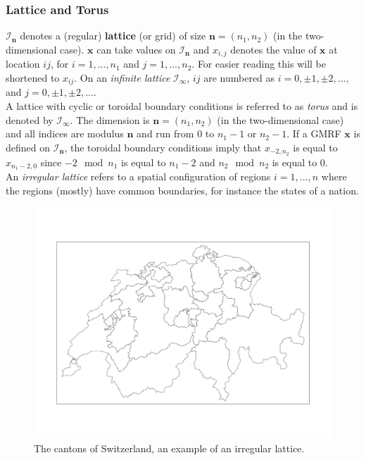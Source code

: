 \subsubsection*{Lattice and Torus}
$\mathcal{I}_{\pmb{n}}$ denotes a (regular) \textbf{lattice} (or grid) of size $\pmb{n}=\left(n_1, n_2\right)$ (in the two-dimensional case). $\pmb{x}$ can take values on $\mathcal{I}_{\pmb{n}}$ and $x_{i,j}$ denotes the value of $\pmb{x}$ at location $ij$, for $i=1,...,n_1$ and $j=1,...,n_2$. For easier reading this will be shortened to $x_{ij}$. On an \textit{infinite lattice} $\mathcal{I}_{\pmb{\infty}}$, $ij$ are numbered as $i=0,\pm1,\pm2,...,$ and $j=0,\pm1,\pm2,...$. \\
A lattice with cyclic or toroidal boundary conditions is referred to as \textit{torus} and is denoted by $\mathcal{I}_{\pmb{\infty}}$. The dimension is $\pmb{n}=\left(n_1,n_2\right)$ (in the two-dimensional case) and all indices are modulus $\pmb{n}$ and run from 0 to $n_1-1$ or $n_2-1$. If a GMRF $\pmb{x}$ is defined on $\mathcal{I}_{\pmb{n}}$, the toroidal boundary conditions imply that $x_{-2,n_2}$ is equal to $x_{n_1-2,0}$ since $-2\mod n_1$ is equal to $n_1-2$ and $n_2\mod n_2$ is equal to 0.\\
An \textit{irregular lattice} refers to a spatial configuration of regions $i=1,...,n$ where the regions (mostly) have common boundaries, for instance the states of a nation.
\begin{figure}[H]
   \centering
       \includegraphics[page=1,width=.7\textwidth]{switzerland.pdf}
 \caption{The cantons of Switzerland, an example of an irregular lattice.}
 \label{fig:lattice}
\end{figure}
